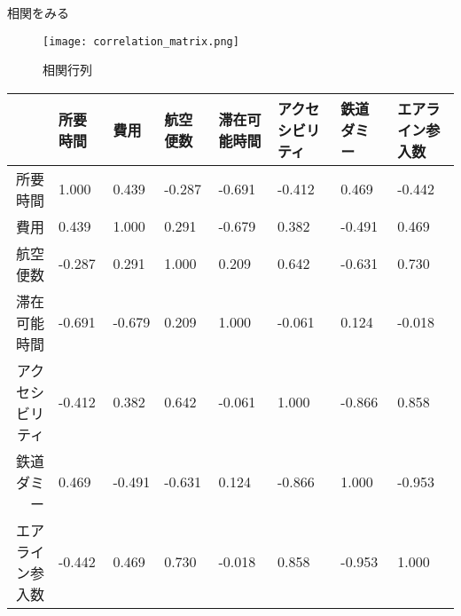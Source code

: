 \documentclass{jsarticle}
\begin{document}
相関をみる

\begin{figure}[htbp]
\begin{center}
\texttt{[image: correlation\_matrix.png]}
\end{center}
\caption{相関行列}
\label{fig:seven}
\end{figure}

\begin{table}[ht]
\centering
\begin{tabular}{rlllllll}
  \hline
 & 所要時間 & 費用 & 航空便数 & 滞在可能時間 & アクセシビリティ & 鉄道ダミー & エアライン参入数 \\ 
  \hline
所要時間 & 1.000 & 0.439 & -0.287 & -0.691 & -0.412 & 0.469 & -0.442 \\ 
  費用 & 0.439 & 1.000 & 0.291 & -0.679 & 0.382 & -0.491 & 0.469 \\ 
  航空便数 & -0.287 & 0.291 & 1.000 & 0.209 & 0.642 & -0.631 & 0.730 \\ 
  滞在可能時間 & -0.691 & -0.679 & 0.209 & 1.000 & -0.061 & 0.124 & -0.018 \\ 
  アクセシビリティ & -0.412 & 0.382 & 0.642 & -0.061 & 1.000 & -0.866 & 0.858 \\ 
  鉄道ダミー & 0.469 & -0.491 & -0.631 & 0.124 & -0.866 & 1.000 & -0.953 \\ 
  エアライン参入数 & -0.442 & 0.469 & 0.730 & -0.018 & 0.858 & -0.953 & 1.000 \\ 
   \hline
\end{tabular}
\end{table}
\end{document}
